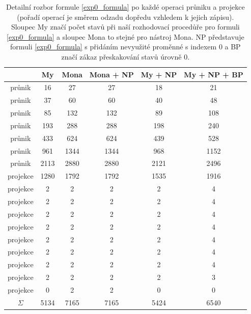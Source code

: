 \begin{table}
    \centering
    \begin{tabular}{ |c||c|c|c|c|c| } 
        \hline
         & My & Mona & Mona + NP & My + NP & My + NP + BP \\ 
        \hline\hline
        průnik & 16 & 27 & 27 & 18 & 21 \\ 
        \hline
        průnik & 37 & 60 & 60 & 40 & 48 \\
        \hline
        průnik & 85 & 132 & 132 & 89 & 108 \\ 
        \hline
        průnik & 193 & 288 & 288 & 198 & 240 \\ 
        \hline
        průnik & 433 & 624 & 624 & 439 & 528 \\ 
        \hline
        průnik & 961 & 1344  & 1344 & 968 & 1152 \\ 
        \hline
        průnik & 2113 & 2880 & 2880 & 2121 & 2496 \\ 
        \hline
        projekce & 1280 & 1792 & 1792 & 1535 & 1916 \\ 
        \hline
        projekce & 2 & 2 & 2 & 2 & 4 \\
        \hline
        projekce & 2 & 2 & 2 & 2 & 4 \\ 
        \hline
        projekce & 2 & 2 & 2 & 2 & 4 \\ 
        \hline
        projekce & 2 & 2 & 2 & 2 & 4 \\ 
        \hline
        projekce & 2 & 2 & 2 & 2 & 4 \\ 
        \hline
        projekce & 2 & 2 & 2 & 2 & 4 \\ 
        \hline
        projekce & 2 & 2 & 2 & 2 & 4 \\ 
        \hline
        projekce & 2 & 2 & 2 & 2 & 3 \\ 
        \hline
        projekce & 0 & 2 & 2 & 0 & 0 \\ 
        \hline\hline
        $\Sigma$ & 5134 & 7165 & 7165 & 5424 & 6540 \\ 
        \hline
    \end{tabular}
    \caption{Detailní rozbor formule \ref{exp0_formula} po každé operaci průniku a projekce (pořadí operací je směrem odzadu dopředu vzhledem k jejich zápisu). Sloupec My značí počet stavů při naší rozhodovací procedůře pro formuli \ref{exp0_formula} a sloupec Mona to stejné pro nástroj Mona. NP představuje formuli \ref{exp0_formula} s přidáním nevyužité proměnné s indexem $0$ a BP značí zákaz přeskakování stavů úrovně $0$.}
    \label{exp0_tbl}
\end{table}


